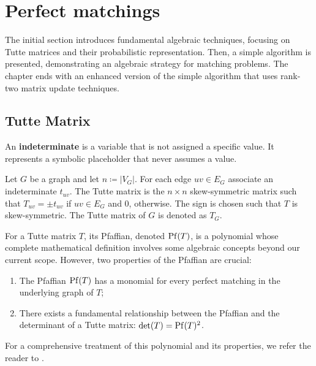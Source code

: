 \chapter{Perfect matchings}
\label{chap:perfect_matching}

The initial section introduces fundamental algebraic techniques, focusing on Tutte matrices and their probabilistic representation. 
Then, a simple algorithm is presented, demonstrating an algebraic strategy for matching problems. 
The chapter ends with an enhanced version of the simple algorithm that uses rank-two matrix update techniques. 

\section{Tutte Matrix}

\begin{definition}[Indeterminates]
    An \textbf{indeterminate} is a variable that is not assigned a specific value. It represents a symbolic placeholder that never assumes a value.
\end{definition}

\begin{definition}
\label{def:tutte_matrix}
    Let \(G\) be a graph and let \(n \coloneqq |V_G|\).
    For each edge \(uv \in E_G\) associate an indeterminate \(t_{uv}\).
    The Tutte matrix is the \(n \times n\) skew-symmetric matrix such that \(T_{uv} = \pm t_{uv}\) if \(uv \in E_G\) and \(0\), otherwise.
    The sign is chosen such that \(T\) is skew-symmetric.
    The Tutte matrix of \(G\) is denoted as \(T_G\).
\end{definition}

For a Tutte matrix \(T\), its Pfaffian, denoted \(\operatorname{Pf}(T)\), is a polynomial whose complete mathematical definition involves some algebraic concepts beyond our current scope. 
However, two properties of the Pfaffian are crucial:
\begin{enumerate}
    \item The Pfaffian \(\operatorname{Pf}(T)\) has a monomial for every perfect matching in the underlying graph of \(T\);
    \item There exists a fundamental relationship between the Pfaffian and the determinant of a Tutte matrix: \(\det(T) = \operatorname{Pf}(T)^2\). 
\end{enumerate}

For a comprehensive treatment of this polynomial and its properties, we refer the reader to \citet[Chapter 7]{Godsil:1993}.

